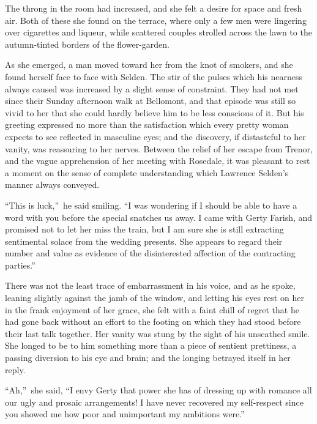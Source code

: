\documentclass[12pt,a4paper]{book}
\begin{document}
The throng in the room had increased, and she felt a desire for
space and fresh air. Both of these she found on the terrace,
where only a few men were lingering over cigarettes and liqueur,
while scattered couples strolled across the lawn to the
autumn-tinted borders of the flower-garden.





As she emerged, a man moved toward her from the knot of smokers,
and she found herself face to face with Selden. The stir of the
pulses which his nearness always caused was increased by a slight
sense of constraint. They had not met since their Sunday
afternoon walk at Bellomont, and that episode was still so vivid
to her that she could hardly believe him to be less conscious of
it. But his greeting expressed no more than the satisfaction
which every pretty woman expects to see reflected in masculine
eyes; and the discovery, if distasteful to her vanity, was
reassuring to her nerves. Between the relief of her escape from
Trenor, and the vague apprehension of her meeting with Rosedale,
it was pleasant to rest a moment on the sense of complete
understanding which Lawrence Selden's manner always conveyed.





``This is luck,''\ he said smiling. ``I was wondering if I should be
able to have a word with you before the special snatches us away. 
I came with Gerty Farish, and promised not to let her miss the
train, but I am sure she is still extracting sentimental solace
from the wedding presents. She appears to regard their number and
value as evidence of the disinterested affection of the
contracting parties.''





There was not the least trace of embarrassment in his voice, and
as he spoke, leaning slightly against the jamb of the window, and
letting his eyes rest on her in the frank enjoyment of her grace,
she felt with a faint chill of regret that he had gone back
without an effort to the footing on which they had stood before
their last talk together. Her vanity was stung by the sight of
his unscathed smile. She longed to be to him something more than
a piece of sentient prettiness, a passing diversion to his eye
and brain; and the longing betrayed itself in her reply.





``Ah,''\ she said, ``I envy Gerty that power she has of dressing up
with romance all our ugly and prosaic arrangements! I have never
recovered my self-respect since you showed me how poor and
unimportant my ambitions were.''
\end{document}
